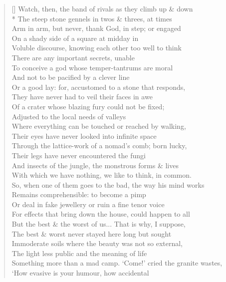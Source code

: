 \documentclass[MAIN]{subfiles}
\begin{document}
\begin{verse}[\versewidth]
Watch, then, the band of rivals as they climb up \& down\\*
\vin The steep stone gennels in twos \& threes, at times\\
Arm in arm, but never, thank God, in step; or engaged\\
\vin On a shady side of a square at midday in\\
Voluble discourse, knowing each other too well to think\\
\vin There are any important secrets, unable\\
To conceive a god whose temper-tantrums are moral\\
\vin And not to be pacified by a clever line\\
Or a good lay: for, accustomed to a stone that responds,\\
\vin They have never had to veil their faces in awe\\
Of a crater whose blazing fury could not be fixed;\\
\vin Adjusted to the local needs of valleys\\
Where everything can be touched or reached by walking,\\
\vin Their eyes have never looked into infinite space\\
Through the lattice-work of a nomad's comb; born lucky,\\
\vin Their legs have never encountered the fungi\\
And insects of the jungle, the monstrous forms \& lives\\
\vin With which we have nothing, we like to think, in common.\\
So, when one of them goes to the bad, the way his mind works\\
\vin Remains comprehensible: to become a pimp\\
Or deal in fake jewellery or ruin a fine tenor voice\\
\vin For effects that bring down the house, could happen to all\\
But the best \& the worst of us... That is why, I suppose,\\
\vin The best \& worst never stayed here long but sought\\
Immoderate soils where the beauty was not so external,\\
\vin The light less public and the meaning of life\\
Something more than a mad camp. `Come!' cried the granite wastes,\\
\vin `How evasive is your humour, how accidental\\

\end{verse}
\end{document}
